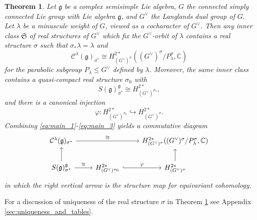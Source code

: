 \documentclass{amsart}
\newcommand{\C}{\mathbb{C}}
\newcommand{\Kir}{\mathcal{C}}
\newcommand{\g}{\mathfrak{g}}
\theoremstyle{definition}
\theoremstyle{plain}
\newtheorem{thm}[defn]{Theorem}
\theoremstyle{remark}
\begin{document}
\begin{thm}
\label{thm:main}
    Let $\g$ be a complex semisimple Lie algebra, $G$ the connected simply connected Lie group with Lie algebra $\g$, and $G^\vee$ the Langlands dual group of $G$. Let $\lambda$ be a minuscule weight of $G$, viewed as a cocharacter of $G^\vee$. Then any inner class $\mathfrak{S}$ of real structures of $G^\vee$ which fix the $G^\vee$-orbit of $\lambda$ contains a real structure $\sigma$ such that $\sigma_* \lambda = \lambda$ and
    \begin{equation}
    \label{eq:main_1}
        \Kir^\lambda(\g)_{\sigma^*}
        \cong
        H^{2*}_{(G^\vee)^\sigma}((G^\vee)^\sigma/P_\lambda^\sigma, \C)
    \end{equation}
    for the parabolic subgroup $P_\lambda\le G^\vee$ defined by $\lambda$. Moreover, the same inner class contains a quasi-compact real structure $\sigma_0$ with
    \begin{equation}
    \label{eq:main_2}
        S(\g)^\g_{\sigma^*}
        \cong
        H^{2*}_{(G^\vee)^{\sigma_0}},
    \end{equation}
    and there is a canonical injection
    \begin{equation}
    \label{eq:main_3}
        \varphi\colon
        H^{2*}_{(G^\vee)^{\sigma_0}}
        \hookrightarrow
        H^{2*}_{(G^\vee)^{\sigma}}.
    \end{equation}
    Combining \eqref{eq:main_1}-\eqref{eq:main_3} yields a commutative diagram
    \begin{equation}
    \label{eq:main_diag}
    \begin{tikzcd}
        \Kir^\lambda(\g)_{\sigma^*}
            \arrow[rr, "\cong"]
        &&
        H^{2*}_{(G^\vee)^\sigma}((G^\vee)^\sigma/P_\lambda^\sigma, \C)
        \\
        S(\g)^\g_{\sigma^*}
            \arrow[u]
            \arrow[r, "\cong"]
        & H^{2*}_{(G^\vee)^{\sigma_0}}
            \arrow[r, hook, "\varphi"]
        & H^{2*}_{(G^\vee)^\sigma}
            \arrow[u]
    \end{tikzcd}    
    \end{equation}
    in which the right vertical arrow is the structure map for equivariant cohomology.
\end{thm}
For a discussion of uniqueness of the real structure $\sigma$ in Theorem \ref{thm:main} see Appendix \ref{sec:uniqueness_and_tables}. 
\end{document}
